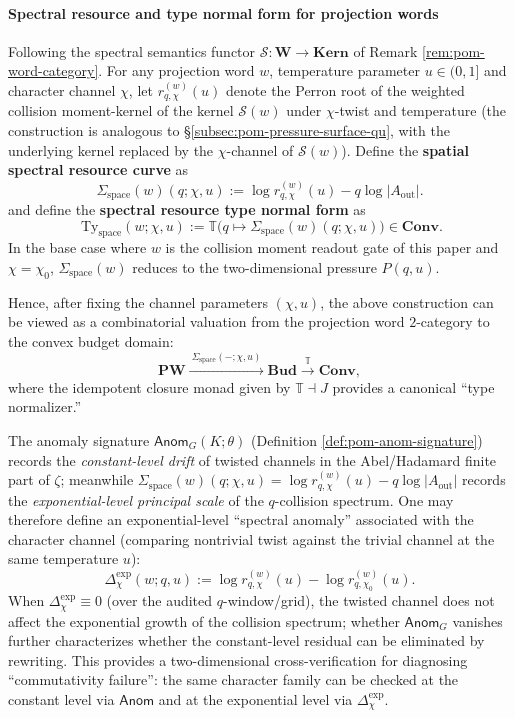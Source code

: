 \paragraph{Spectral resource and type normal form for projection words}
Following the spectral semantics functor \(\mathcal{S}:\mathbf{W}\to \mathbf{Kern}\) of Remark \ref{rem:pom-word-category}.
For any projection word \(w\), temperature parameter \(u\in(0,1]\) and character channel \(\chi\), let \(r^{(w)}_{q,\chi}(u)\) denote the Perron root of the weighted collision moment-kernel of the kernel \(\mathcal{S}(w)\) under \(\chi\)-twist and temperature (the construction is analogous to \S\ref{subsec:pom-pressure-surface-qu}, with the underlying kernel replaced by the \(\chi\)-channel of \(\mathcal{S}(w)\)).
Define the \textbf{spatial spectral resource curve} as
\[
\Sigma_{\mathrm{space}}(w)(q;\chi,u)
:=\log r^{(w)}_{q,\chi}(u)-q\log|A_{\mathrm{out}}|.
\]
and define the \textbf{spectral resource type normal form} as
\[
\boxed{\;
\mathrm{Ty}_{\mathrm{space}}(w;\chi,u)
:=\mathbb{T}\bigl(q\mapsto \Sigma_{\mathrm{space}}(w)(q;\chi,u)\bigr)\in\mathbf{Conv}.}
\]
In the base case where \(w\) is the collision moment readout gate of this paper and \(\chi=\chi_0\), \(\Sigma_{\mathrm{space}}(w)\) reduces to the two-dimensional pressure \(P(q,u)\).

Hence, after fixing the channel parameters \((\chi,u)\), the above construction can be viewed as a combinatorial valuation from the projection word $2$-category to the convex budget domain:
\[
\mathbf{PW}\xrightarrow{\ \Sigma_{\mathrm{space}}(-;\chi,u)\ }\mathbf{Bud}\xrightarrow{\ \mathbb{T}\ }\mathbf{Conv},
\]
where the idempotent closure monad given by \(\mathbb{T}\dashv J\) provides a canonical ``type normalizer.''

\begin{remark}\label{rem:pom-constant-vs-exponential-anom}
The anomaly signature \(\mathsf{Anom}_G(K;\theta)\) (Definition \ref{def:pom-anom-signature}) records the \emph{constant-level drift} of twisted channels in the Abel/Hadamard finite part of \(\zeta\);
meanwhile \(\Sigma_{\mathrm{space}}(w)(q;\chi,u)=\log r^{(w)}_{q,\chi}(u)-q\log|A_{\mathrm{out}}|\) records the \emph{exponential-level principal scale} of the \(q\)-collision spectrum.
One may therefore define an exponential-level ``spectral anomaly'' associated with the character channel (comparing nontrivial twist against the trivial channel at the same temperature \(u\)):
\[
\Delta^{\mathrm{exp}}_{\chi}(w;q,u)
:=\log r^{(w)}_{q,\chi}(u)-\log r^{(w)}_{q,\chi_0}(u).
\]
When \(\Delta^{\mathrm{exp}}_{\chi}\equiv 0\) (over the audited \(q\)-window/grid), the twisted channel does not affect the exponential growth of the collision spectrum; whether \(\mathsf{Anom}_G\) vanishes further characterizes whether the constant-level residual can be eliminated by rewriting.
This provides a two-dimensional cross-verification for diagnosing ``commutativity failure'': the same character family can be checked at the constant level via \(\mathsf{Anom}\) and at the exponential level via \(\Delta^{\mathrm{exp}}_{\chi}\).
\end{remark}

